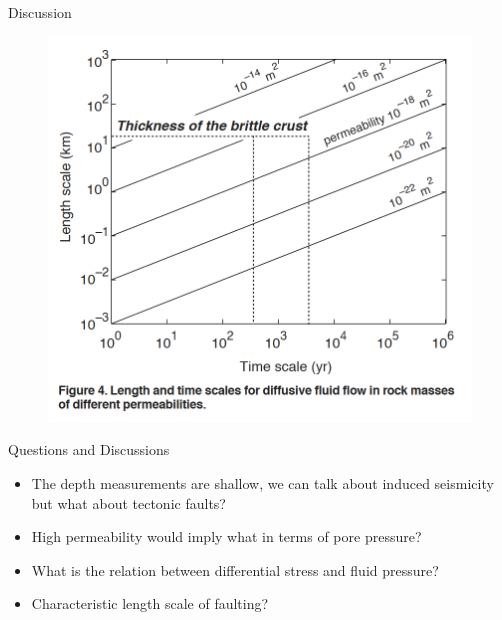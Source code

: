 \documentclass[12pt]{beamer}
\begin{document}
\begin{frame}[fragile]{Discussion}
    \begin{figure}
        \includegraphics[width=0.7\linewidth]{images/4}
    \end{figure}
\end{frame}

\begin{frame}[fragile]{Questions and Discussions}
    \begin{itemize}
        \item The depth measurements are shallow, we can talk about induced seismicity but what about tectonic faults?
        \item High permeability would imply what in terms of pore pressure?
        \item What is the relation between differential stress and fluid pressure?
        \item Characteristic length scale of faulting?
    \end{itemize}

\end{frame}
\end{document}
